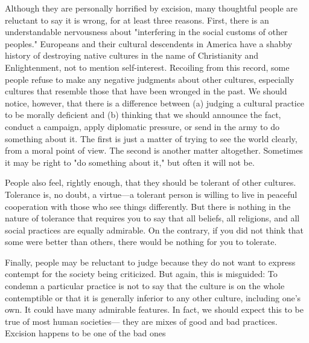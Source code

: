 Although  they  are  personally  horrified  by  excision,  many  thoughtful 
people  are  reluctant  to  say  it  is  wrong,  for  at  least  three  reasons.  First, 
there  is  an  understandable  nervousness  about  "interfering  in  the  social 
customs of other peoples." Europeans and their cultural descendents in 
America have a shabby history of destroying native cultures in the name 
of Christianity and Enlightenment, not to mention self-interest. Recoiling 
from  this  record,  some  people  refuse  to  make  any  negative  judgments 
about  other  cultures,  especially  cultures  that  resemble  those  that  have 
been  wronged  in  the  past.  We  should  notice,  however,  that  there  is  a 
difference between (a) judging a cultural practice to be morally deficient 
and (b) thinking that we should announce the fact, conduct a campaign, 
apply diplomatic pressure, or send in the army to do something about it. 
The  first  is  just  a  matter  of  trying to  see  the world clearly,  from  a  moral 
point  of  view.  The  second  is  another  matter  altogether.  Sometimes  it 
may be right to "do something about it," but often it will not be. 

People  also  feel,  rightly  enough,  that  they  should  be  tolerant  of  other 
cultures. Tolerance is, no doubt, a virtue—a tolerant  person is willing to 
live  in  peaceful  cooperation  with  those  who  see  things  differently.  But 
there is nothing in the nature of tolerance that requires you to say that all 
beliefs,  all  religions,  and  all  social  practices  are  equally  admirable.  On 
the contrary, if you did not think that some were better than others, there 
would be nothing for you to tolerate. 

Finally,  people  may  be  reluctant  to  judge  because  they  do  not  want  to 
express  contempt  for  the  society  being  criticized.  But  again,  this  is 
misguided: To condemn a particular practice is not to say that the culture 
is  on  the  whole  contemptible  or  that  it  is  generally  inferior  to  any  other 
culture,  including  one's  own.  It  could  have  many  admirable  features.  In 
fact, we should expect this to be true of most human societies— they are 
mixes of good and bad practices. Excision happens to be one of the bad 
ones